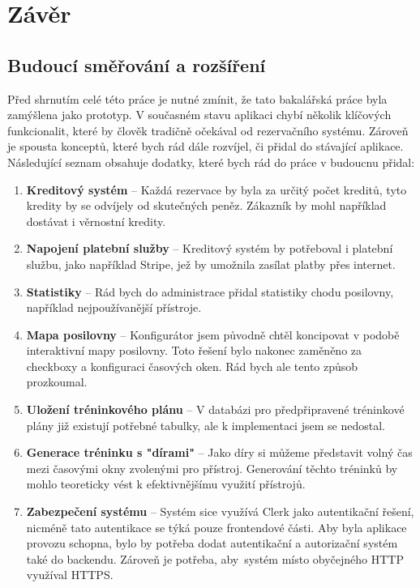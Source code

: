\chapter{Závěr} \label{conclusion}

\section{Budoucí směřování a rozšíření}

Před shrnutím celé této práce je nutné zmínit, že tato bakalářská práce byla zamýšlena jako prototyp. V současném stavu aplikaci chybí několik klíčových funkcionalit, které by člověk tradičně očekával od rezervačního systému. Zároveň je spousta konceptů, které bych rád dále rozvíjel, či přidal do stávající aplikace. Následující seznam obsahuje dodatky, které bych rád do práce v budoucnu přidal:

\begin{enumerate}
    \item \textbf{Kreditový systém} – Každá rezervace by byla za určitý počet kreditů, tyto kredity by se odvíjely od skutečných peněz. Zákazník by mohl například dostávat i věrnostní kredity.
    \item \textbf{Napojení platební služby} – Kreditový systém by potřeboval i platební službu, jako například Stripe, jež by umožnila zasílat platby přes internet.
    \item \textbf{Statistiky} – Rád bych do administrace přidal statistiky chodu posilovny, například nejpoužívanější přístroje.
    \item \textbf{Mapa posilovny} – Konfigurátor jsem původně chtěl koncipovat v podobě interaktivní mapy posilovny. Toto řešení bylo nakonec zaměněno za checkboxy a konfiguraci časových oken. Rád bych ale tento způsob prozkoumal.
    \item \textbf{Uložení tréninkového plánu} – V databázi pro předpřipravené tréninkové plány již existují potřebné tabulky, ale k implementaci jsem se nedostal.
    \item \textbf{Generace tréninku s "dírami"} – Jako díry si můžeme představit volný čas mezi časovými okny zvolenými pro přístroj. Generování těchto tréninků by mohlo teoreticky vést k efektivnějšímu využití přístrojů.
    \item \textbf{Zabezpečení systému} – Systém sice využívá Clerk jako autentikační řešení, nicméně tato autentikace se týká pouze frontendové části. Aby byla aplikace provozu schopna, bylo by potřeba dodat autentikační a autorizační systém také do backendu. Zároveň je potřeba, aby~systém místo obyčejného HTTP využíval HTTPS.
\end{enumerate}

